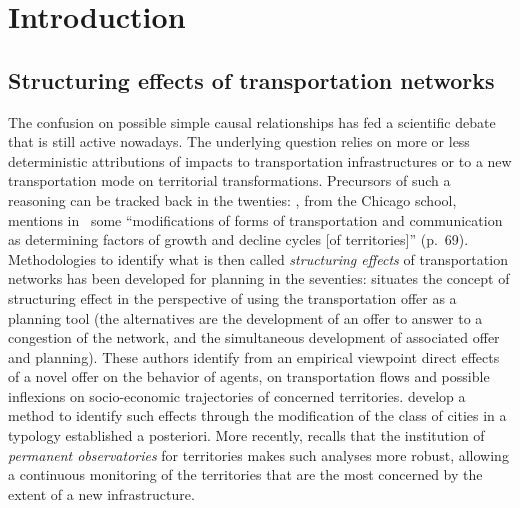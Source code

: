 








\section{Introduction}

\subsection{Structuring effects of transportation networks}

The confusion on possible simple causal relationships has fed a scientific debate that is still active nowadays. The underlying question relies on more or less deterministic attributions of impacts to transportation infrastructures or to a new transportation mode on territorial transformations. Precursors of such a reasoning can be tracked back in the twenties: , from the Chicago school, mentions in~\cite{burgess1925city} some ``modifications of forms of transportation and communication as determining factors of growth and decline cycles [of territories]'' (p.~69). Methodologies to identify what is then called \emph{structuring effects} of transportation networks has been developed for planning in the seventies: \cite{bonnafous1974methodologies} situates the concept of structuring effect in the perspective of using the transportation offer as a planning tool (the alternatives are the development of an offer to answer to a congestion of the network, and the simultaneous development of associated offer and planning). These authors identify from an empirical viewpoint direct effects of a novel offer on the behavior of agents, on transportation flows and possible inflexions on socio-economic trajectories of concerned territories. \cite{bonnafous1974detection} develop a method to identify such effects through the modification of the class of cities in a typology established a posteriori. More recently, \cite{bonnafous2014observatoires} recalls that the institution of \emph{permanent observatories} for territories makes such analyses more robust, allowing a continuous monitoring of the territories that are the most concerned by the extent of a new infrastructure.

